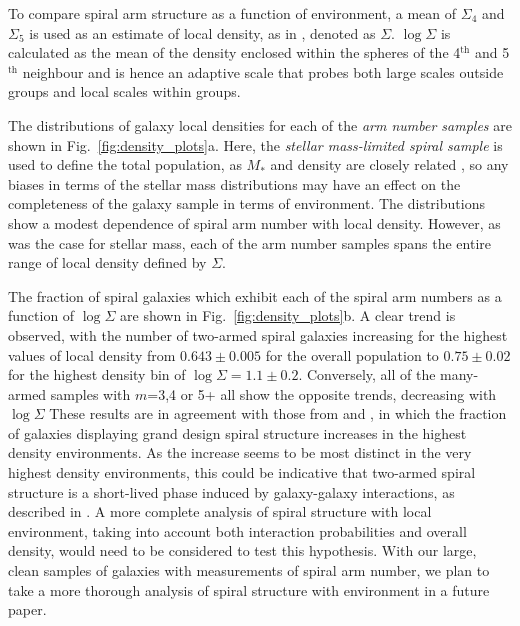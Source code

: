 \documentclass[useAMS,usenatbib]{mn2e}
\begin{document}
To compare spiral arm structure as a function of environment, a mean of $\Sigma_4$ and $\Sigma_5$ is used as an estimate of local density, as in \citet{Baldry_06,Bamford_09}, denoted as $\Sigma$. $\log\Sigma$ is calculated as the mean of the density enclosed within the spheres of the 4$^\mathrm{th}$ and 5$^\mathrm{th}$ neighbour and is hence an adaptive scale that probes both large scales outside groups and local scales within groups. 

The distributions of galaxy local densities for each of the \textit{arm number samples} are shown in Fig.~\ref{fig:density_plots}a. Here, the \textit{stellar mass-limited spiral sample} is used to define the total population, as $M_*$ and density are closely related \citep{Baldry_06}, so any biases in terms of the stellar mass distributions may have an effect on the completeness of the galaxy sample in terms of environment. The distributions show a modest dependence of spiral arm number with local density. However, as was the case for stellar mass, each of the arm number samples spans the entire range of local density defined by $\Sigma$. 

The fraction of spiral galaxies which exhibit each of the spiral arm numbers  as a function of $\log \Sigma$ are shown in Fig.~\ref{fig:density_plots}b. A clear trend  is observed, with the number of two-armed spiral galaxies increasing for the highest values of local density from $0.643 \pm 0.005$ for the overall population to $0.75 \pm 0.02$ for the highest density bin of $\log \Sigma = 1.1 \pm 0.2$. Conversely, all of the many-armed samples with $m$=3,4 or 5+ all show the opposite trends, decreasing with $\log\Sigma$ These results are in agreement with those from \citet{EE_82} and \citet{Ann_14}, in which the fraction of galaxies displaying grand design spiral structure increases in the highest density environments. As the increase seems to be most distinct in the very highest density environments, this could be indicative that two-armed spiral structure is a  short-lived phase induced by galaxy-galaxy interactions, as described in \citet{EE_86}. A more complete analysis of spiral structure with local environment, taking into account both interaction probabilities and overall density, would need to be considered to test this hypothesis. With our large, clean samples of galaxies with measurements of spiral arm number, we plan to take a more thorough analysis of spiral structure with environment in a future paper.

\end{document}
